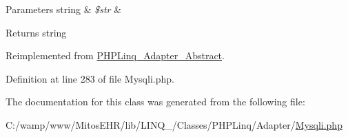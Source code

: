 \begin{DoxyParams}[1]{\-Parameters}
string & {\em \$str} & \\
\hline
\end{DoxyParams}
\begin{DoxyReturn}{\-Returns}
string 
\end{DoxyReturn}


\-Reimplemented from \hyperlink{class_p_h_p_linq___adapter___abstract_a7d8809b3fca65a75b2bd2ebbea5b3695}{\-P\-H\-P\-Linq\-\_\-\-Adapter\-\_\-\-Abstract}.



\-Definition at line 283 of file \-Mysqli.\-php.




\-The documentation for this class was generated from the following file\-:\begin{DoxyCompactItemize}
\item 
\-C\-:/wamp/www/\-Mitos\-E\-H\-R/lib/\-L\-I\-N\-Q\-\_/\-Classes/\-P\-H\-P\-Linq/\-Adapter/\hyperlink{_mysqli_8php}{\-Mysqli.\-php}\end{DoxyCompactItemize}
